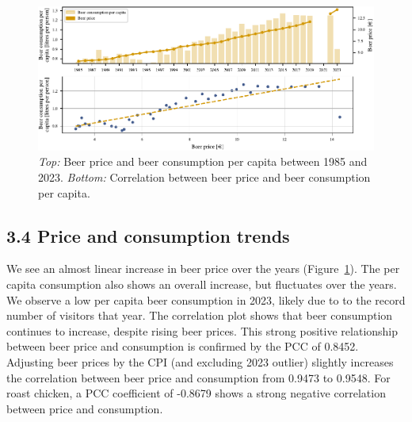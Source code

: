 \documentclass{article}
\theoremstyle{plain}
\theoremstyle{definition}
\theoremstyle{remark}
\begin{document}
\begin{figure}[ht] %
\includegraphics{fig/beer_consumption.pdf} %
\caption{\textit{Top:} Beer price and beer consumption per capita between 1985 and 2023. \textit{Bottom:} Correlation between beer price and beer consumption per capita.}
\label{fig:beer_consumption}
\end{figure}
\subsection*{3.4 Price and consumption trends}
We see an almost linear increase in beer price over the years (Figure~\ref{fig:beer_consumption}). The per capita consumption also shows an overall increase, but fluctuates over the years. We observe a low per capita beer consumption in 2023, likely due to to the record number of visitors that year. The correlation plot shows that beer consumption continues to increase, despite rising beer prices. This strong positive relationship between beer price and consumption is confirmed by the PCC of 0.8452. Adjusting beer prices by the CPI (and excluding 2023 outlier) slightly increases the correlation between beer price and consumption from 0.9473 to 0.9548. For roast chicken, a PCC coefficient of -0.8679 shows a strong negative correlation between price and consumption.
\end{document}
